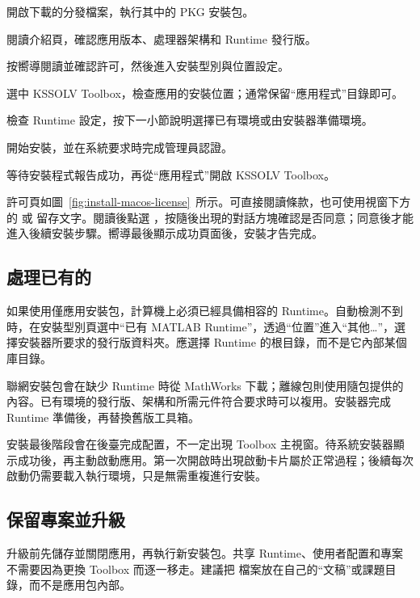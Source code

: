 \begin{steps}
\item 開啟下載的分發檔案，執行其中的 PKG 安裝包。
\item 閱讀介紹頁，確認應用版本、處理器架構和 Runtime 發行版。
\item 按嚮導閱讀並確認許可，然後進入安裝型別與位置設定。
\item 選中 KSSOLV Toolbox，檢查應用的安裝位置；通常保留“應用程式”目錄即可。
\item 檢查 Runtime 設定，按下一小節說明選擇已有環境或由安裝器準備環境。
\item 開始安裝，並在系統要求時完成管理員認證。
\item 等待安裝程式報告成功，再從“應用程式”開啟 KSSOLV Toolbox。
\end{steps}

許可頁如圖~\ref{fig:install-macos-license}~所示。可直接閱讀條款，也可使用視窗下方的  或  留存文字。閱讀後點選 ，按隨後出現的對話方塊確認是否同意；同意後才能進入後續安裝步驟。嚮導最後顯示成功頁面後，安裝才告完成。



\subsection{處理已有的 }

如果使用僅應用安裝包，計算機上必須已經具備相容的 Runtime。自動檢測不到時，在安裝型別頁選中“已有 MATLAB\regmark{} Runtime”，透過“位置”進入“其他…”，選擇安裝器所要求的發行版資料夾。應選擇 Runtime 的根目錄，而不是它內部某個庫目錄。

聯網安裝包會在缺少 Runtime 時從 MathWorks 下載；離線包則使用隨包提供的內容。已有環境的發行版、架構和所需元件符合要求時可以複用。安裝器完成 Runtime 準備後，再替換舊版工具箱。

安裝最後階段會在後臺完成配置，不一定出現 Toolbox 主視窗。待系統安裝器顯示成功後，再主動啟動應用。第一次開啟時出現啟動卡片屬於正常過程；後續每次啟動仍需要載入執行環境，只是無需重複進行安裝。

\subsection{保留專案並升級}

升級前先儲存並關閉應用，再執行新安裝包。共享 Runtime、使用者配置和專案不需要因為更換 Toolbox 而逐一移走。建議把  檔案放在自己的“文稿”或課題目錄，而不是應用包內部。

